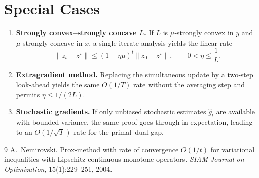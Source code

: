 \documentclass{article}
\begin{document}
\section*{Special Cases}
\begin{enumerate}
\item \textbf{Strongly convex–strongly concave $L$.} If $L$ is $\mu$‑strongly convex in $y$ and $\mu$‑strongly concave in $x$, a single‑iterate analysis yields the linear rate
\[
\|z_{t}-z^{\star}\|\le (1-\eta\mu)^{t}\|z_{0}-z^{\star}\|,
\qquad 0<\eta\le \frac{1}{L}.
\]
\item \textbf{Extragradient method.} Replacing the simultaneous update by a two‑step look‑ahead yields the same $O(1/T)$ rate without the averaging step and permits $\eta\le 1/(2L)$.
\item \textbf{Stochastic gradients.} If only unbiased stochastic estimates $\hat g_{t}$ are available with bounded variance, the same proof goes through in expectation, leading to an $O(1/\sqrt{T})$ rate for the primal–dual gap.
\end{enumerate}

\begin{thebibliography}{9}
A.~Nemirovski.
\newblock Prox-method with rate of convergence $O(1/t)$ for variational inequalities with Lipschitz continuous monotone operators.
\newblock \emph{SIAM Journal on Optimization}, 15(1):229–251, 2004.
\end{thebibliography}
\end{document}
